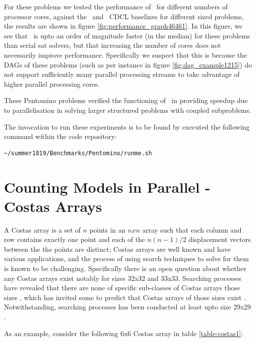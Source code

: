 \documentclass[
10pt, %
a4paper, %
oneside, %
headinclude,footinclude, %
BCOR5mm, %
]{scrartcl}
\begin{document}
For these problems we tested the performance of \dagster\ for different numbers of processor cores, against the  \tinisat\ and \lingeling\ CDCL baselines for different sized problems, the results are shown in figure \ref{fig:performance_graph46461}.
In this figure, we see that \dagster\ is upto an order of magnitude faster (in the median) for these problems than serial sat solvers, but that increasing the number of cores does not necessarily improve performance.
Specifically we suspect that this is because the DAGs of these problems (such as per instance in figure \ref{fig:dag_example1215}) do not support sufficiently many parallel processing streams to take advantage of higher parallel processing cores.



These Pentomino problems verified the functioning of \dagster\ in providing speedup due to parallelisation in solving larger structured problems with coupled subproblems. 

The invocation to run these experiments is to be found by executed the following command within the code repository:
\begin{verbatim}
~/summer1819/Benchmarks/Pentomino/runme.sh
\end{verbatim}



\clearpage
\section{Counting Models in Parallel - Costas Arrays}

A Costas array is a set of $n$ points in an $nxn$ array such that each column and row contains exactly one point and each of the $n(n-1)/2$ displacement vectors between the the points are distinct; Costas arrays are well known and have various applications, and the process of using search techniques to solve for them is known to be challenging.
Specifically there is an open question about whether any Costas arrays exist notably for sizes 32x32 and 33x33.
Searching processes have revealed that there are none of specific sub-classes of Costas arrays those sizes \cite{748721}, which has invited some to predict that Costas arrays of those sizes exist \cite{conf/ciss/RussoEB10}.
Notwithstanding, searching processes has been conducted at least upto size 29x29 \cite{DBLP:journals/amco/DrakakisIRW11}.


As an example, consider the following 6x6 Costas array in table \ref{table:costas1}:
\end{document}
